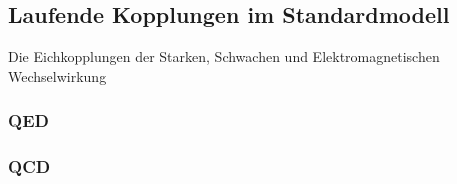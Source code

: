 \clearpage
\subsection{Laufende Kopplungen im Standardmodell}\label{Laufende_Kopplungen_im_Standardmodell}

  Die Eichkopplungen der Starken, Schwachen und Elektromagnetischen Wechselwirkung \cite{PDG:QCD}
  
  \subsubsection{QED}
  
  \subsubsection{QCD}